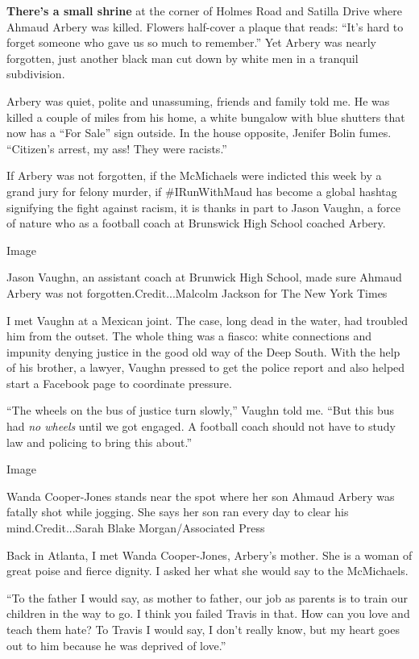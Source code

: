 \textbf{There's a small shrine} at the corner of Holmes Road and Satilla
Drive where Ahmaud Arbery was killed. Flowers half-cover a plaque that
reads: ``It's hard to forget someone who gave us so much to remember.''
Yet Arbery was nearly forgotten, just another black man cut down by
white men in a tranquil subdivision.

Arbery was quiet, polite and unassuming, friends and family told me. He
was killed a couple of miles from his home, a white bungalow with blue
shutters that now has a ``For Sale'' sign outside. In the house
opposite, Jenifer Bolin fumes. ``Citizen's arrest, my ass! They were
racists.''

If Arbery was not forgotten, if the McMichaels were indicted this week
by a grand jury for felony murder, if \#IRunWithMaud has become a global
hashtag signifying the fight against racism, it is thanks in part to
Jason Vaughn, a force of nature who as a football coach at Brunswick
High School coached Arbery.

Image

Jason Vaughn, an assistant coach at Brunwick High School, made sure
Ahmaud Arbery was not forgotten.Credit...Malcolm Jackson for The New
York Times

I met Vaughn at a Mexican joint. The case, long dead in the water, had
troubled him from the outset. The whole thing was a fiasco: white
connections and impunity denying justice in the good old way of the Deep
South. With the help of his brother, a lawyer, Vaughn pressed to get the
police report and also helped start a Facebook page to coordinate
pressure.

``The wheels on the bus of justice turn slowly,'' Vaughn told me. ``But
this bus had \emph{no wheels} until we got engaged. A football coach
should not have to study law and policing to bring this about.''

Image

Wanda Cooper-Jones stands near the spot where her son Ahmaud Arbery was
fatally shot while jogging. She says her son ran every day to clear his
mind.Credit...Sarah Blake Morgan/Associated Press

Back in Atlanta, I met Wanda Cooper-Jones, Arbery's mother. She is a
woman of great poise and fierce dignity. I asked her what she would say
to the McMichaels.

``To the father I would say, as mother to father, our job as parents is
to train our children in the way to go. I think you failed Travis in
that. How can you love and teach them hate? To Travis I would say, I
don't really know, but my heart goes out to him because he was deprived
of love.''

